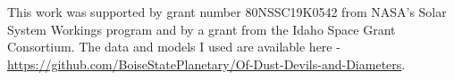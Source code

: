 \documentclass{aastex63}
\begin{document}
\acknowledgments
This work was supported by grant number 80NSSC19K0542 from NASA's Solar System Workings program and by a grant from the Idaho Space Grant Consortium. The data and models I used are available here - \href{https://github.com/BoiseStatePlanetary/Of-Dust-Devils-and-Diameters}{https://github.com/BoiseStatePlanetary/Of-Dust-Devils-and-Diameters}.





\end{document}
